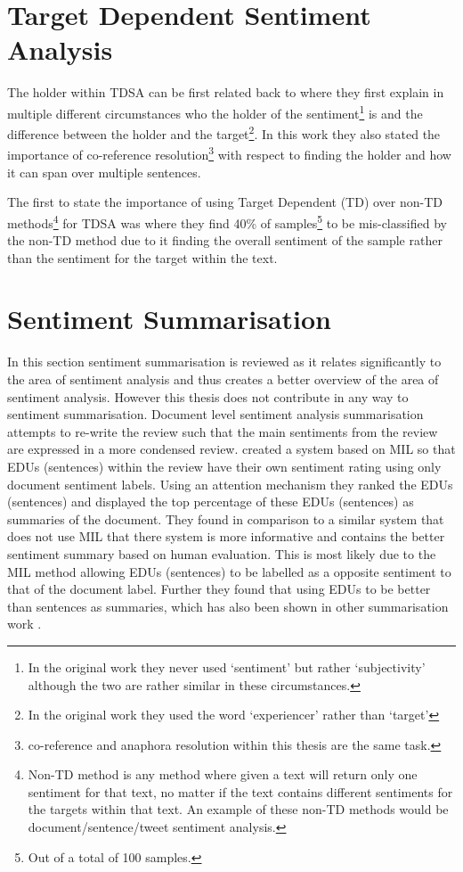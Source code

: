 \section{Target Dependent Sentiment Analysis}
The holder within TDSA can be first related back to \citet{wiebe-1990-identifying} where they first explain in multiple different circumstances who the holder of the sentiment\footnote{In the original work they never used `sentiment' but rather `subjectivity' although the two are rather similar in these circumstances.} is and the difference between the holder and the target\footnote{In the original work they used the word `experiencer' rather than `target'}. In this work they also stated the importance of co-reference resolution\footnote{co-reference and anaphora resolution within this thesis are the same task.} with respect to finding the holder and how it can span over multiple sentences.

The first to state the importance of using Target Dependent (TD) over non-TD methods\footnote{Non-TD method is any method where given a text will return only one sentiment for that text, no matter if the text contains different sentiments for the targets within that text. An example of these non-TD methods would be document/sentence/tweet sentiment analysis.} for TDSA was \citet{jiang-etal-2011-target} where they find 40\% of samples\footnote{Out of a total of 100 samples.} to be mis-classified by the non-TD method due to it finding the overall sentiment of the sample rather than the sentiment for the target within the text.  

\section{Sentiment Summarisation}
In this section sentiment summarisation is reviewed as it relates significantly to the area of sentiment analysis and thus creates a better overview of the area of sentiment analysis. However this thesis does not contribute in any way to sentiment summarisation. Document level sentiment analysis summarisation attempts to re-write the review such that the main sentiments from the review are expressed in a more condensed review. \citet{angelidis-lapata-2018-multiple} created a system based on MIL so that EDUs (sentences) within the review have their own sentiment rating using only document sentiment labels. Using an attention mechanism they ranked the EDUs (sentences) and displayed the top percentage of these EDUs (sentences) as summaries of the document. They found in comparison to a similar system that does not use MIL \citep{yang-etal-2016-hierarchical} that there system is more informative and contains the better sentiment summary based on human evaluation. This is most likely due to the MIL method allowing EDUs (sentences) to be labelled as a opposite sentiment to that of the document label. Further they found that using EDUs to be better than sentences as summaries, which has also been shown in other summarisation work \citep{li-etal-2016-role}. 